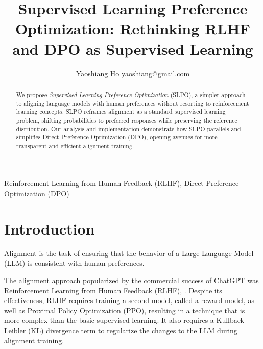\documentclass[twoside,11pt]{article}
\begin{document}
\title{Supervised Learning Preference Optimization: Rethinking RLHF and DPO as Supervised Learning}

\author{\name Yaoshiang Ho \email yaoshiang@gmail.com \\
      }

\editor{}

\maketitle 

\begin{abstract}%
We propose \emph{Supervised Learning Preference Optimization} (SLPO), 
a simpler approach to aligning language models with human preferences 
without resorting to reinforcement learning concepts. SLPO reframes 
alignment as a standard supervised learning problem, shifting 
probabilities to preferred responses while preserving the 
reference distribution. Our analysis and implementation demonstrate 
how SLPO parallels and simplifies Direct Preference Optimization (DPO), 
opening avenues for more transparent and efficient alignment training.  
\end{abstract}

\begin{keywords}
  Reinforcement Learning from Human Feedback (RLHF), 
  Direct Preference Optimization (DPO)
\end{keywords}

\section{Introduction}

Alignment is the task of ensuring that the behavior of a
Large Language Model (LLM) is consistent 
with human preferences. 

The alignment approach popularized by the commercial success of ChatGPT was 
Reinforcement Learning from Human Feedback (RLHF), \citep{ouyang2022training}. 
Despite its effectiveness, RLHF requires training a second model, called
a reward model, as well as Proximal Policy Optimization (PPO), resulting in a 
technique that is more complex than the basic supervised learning. It also
requires a Kullback-Leibler (KL) divergence term to regularize the
changes to the LLM during alignment training.
\end{document}
